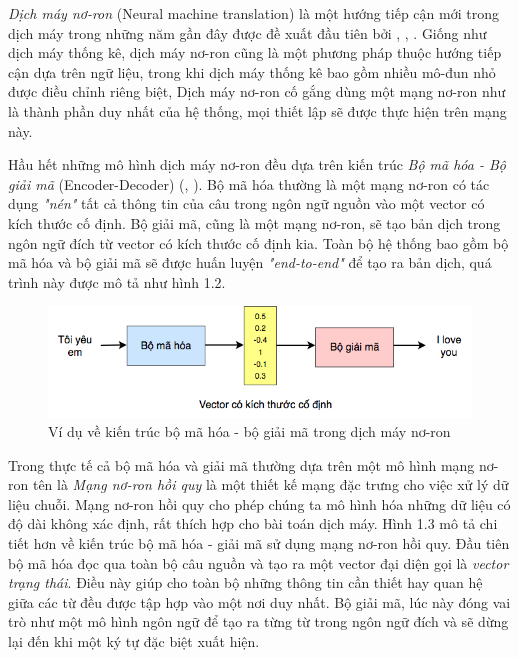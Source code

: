 \textit{Dịch máy nơ-ron} (Neural machine translation) là một hướng tiếp cận mới trong dịch máy trong những năm gần đây được đề xuất đầu tiên bởi \cite{kalchbrenner}, \cite{sutskever}, \cite{cho}. Giống như dịch máy thống kê, dịch máy nơ-ron cũng là một phương pháp thuộc hướng tiếp cận dựa trên ngữ liệu, trong khi dịch máy thống kê bao gồm nhiều mô-đun nhỏ được điều chỉnh riêng biệt, Dịch máy nơ-ron cố gắng dùng một mạng nơ-ron như là thành phần duy nhất của hệ thống, mọi thiết lập sẽ được thực hiện trên mạng này. 

Hầu hết những mô hình dịch máy nơ-ron đều dựa trên kiến trúc \textit{Bộ mã hóa - Bộ giải mã} (Encoder-Decoder) (\cite{sutskever}, \cite{cho}). Bộ mã hóa thường là một mạng nơ-ron có tác dụng \textit{"nén"} tất cả thông tin của câu trong ngôn ngữ nguồn vào một vector có kích thước cố định. Bộ giải mã, cũng là một mạng nơ-ron, sẽ tạo bản dịch trong ngôn ngữ đích từ vector có kích thước cố định kia. Toàn bộ hệ thống bao gồm bộ mã hóa và bộ giải mã sẽ được huấn luyện \textit{"end-to-end"} để tạo ra bản dịch, quá trình này được mô tả như hình 1.2.

\begin{figure}
	\centering
	\includegraphics[width=\textwidth]{intro2nmt}
	\caption[Ví dụ về Kiến trúc \textit{bộ mã hóa - bộ giải mã} trong dịch máy bơ-ron]{Ví dụ về kiến trúc bộ mã hóa - bộ giải mã trong dịch máy nơ-ron}
	\label{fig_intronmt}
\end{figure}

Trong thực tế cả bộ mã hóa và giải mã thường dựa trên một mô hình mạng nơ-ron tên là \textit{Mạng nơ-ron hồi quy} là một thiết kế mạng đặc trưng cho việc xử lý dữ liệu chuỗi. Mạng nơ-ron hồi quy cho phép chúng ta mô hình hóa những dữ liệu có độ dài không xác định, rất thích hợp cho bài toán dịch máy. Hình 1.3 mô tả chi tiết hơn về kiến trúc bộ mã hóa - giải mã sử dụng mạng nơ-ron hồi quy. Đầu tiên bộ mã hóa đọc qua toàn bộ câu nguồn và tạo ra một vector đại diện gọi là \textit{vector trạng thái}. Điều này giúp cho toàn bộ những thông tin cần thiết hay quan hệ giữa các từ đều được tập hợp vào một nơi duy nhất. Bộ giải mã, lúc này đóng vai trò như một mô hình ngôn ngữ để tạo ra từng từ trong ngôn ngữ đích và sẽ dừng lại đến khi một ký tự đặc biệt xuất hiện.

